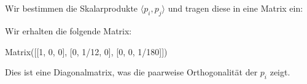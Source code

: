 \section{}

Wir bestimmen die Skalarprodukte $\langle p_i, p_j \rangle$ und tragen diese in eine Matrix ein:



Wir erhalten die folgende Matrix:

\begin{consoleoutput}
Matrix([[1, 0, 0], [0, 1/12, 0], [0, 0, 1/180]])
\end{consoleoutput}

Dies ist eine Diagonalmatrix, was die paarweise Orthogonalität der $p_i$ zeigt.
